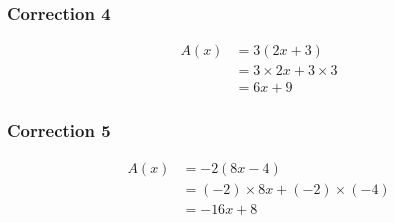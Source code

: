 \documentclass[15pt, mathserif]{beamer}
\begin{document}
\begin{frame}
\vspace{-10mm}
	\frametitle{Correction 4}
	\begin{align*} A(x) &= 3\left(2 x+3\right) \\
		&=3\times2 x+3\times3\\
		&=6 x+9
	\end{align*}\end{frame}


\begin{frame}
\vspace{-10mm}
	\frametitle{Correction 5}
	\begin{align*} A(x) &= -2\left(8 x-4\right) \\
		&=\left(-2\right)\times8 x+\left(-2\right)\times\left(-4\right)\\
		&=-16 x+8
	\end{align*}\end{frame}
\end{document}
